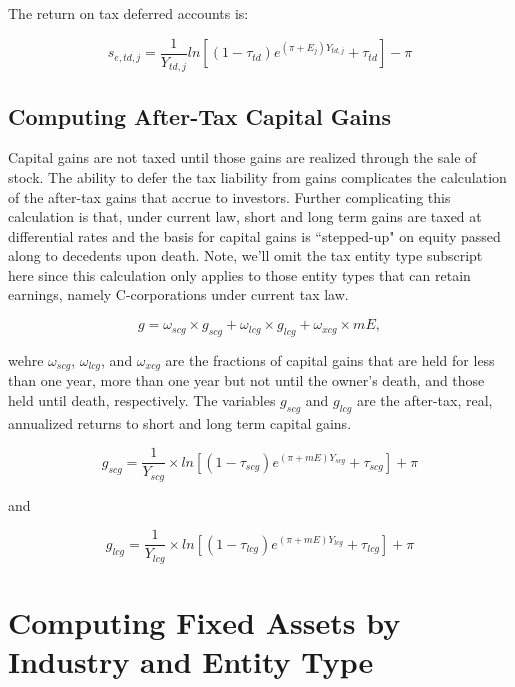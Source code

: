 \documentclass[article,11pt,letterpaper,fleqn]{article}
\theoremstyle{definition}
\numberwithin{equation}{section}
\begin{document}
 The return on tax deferred accounts is:
 
 \begin{equation}
s_{e,td,j} = \frac{1}{Y_{td,j}}ln \left[(1-\tau_{td})e^{(\pi+E_{j})Y_{td,j}}+\tau_{td}\right]-\pi
\end{equation}
 

\subsection{Computing After-Tax Capital Gains}

Capital gains are not taxed until those gains are realized through the sale of stock.  The ability to defer the tax liability from gains complicates the calculation of the after-tax gains that accrue to investors. Further complicating this calculation is that, under current law, short and long term gains are taxed at differential rates and the basis for capital gains is ``stepped-up" on equity passed along to decedents upon death.  Note, we'll omit the tax entity type subscript here since this calculation only applies to those entity types that can retain earnings, namely C-corporations under current tax law. 

\begin{equation}
g = \omega_{scg}\times g_{scg} + \omega_{lcg}\times g_{lcg} + \omega_{xcg}\times mE,
\end{equation}
 
 \noindent\noindent wehre $\omega_{scg}$, $\omega_{lcg}$, and $\omega_{xcg}$ are the fractions of capital gains that are held for less than one year, more than one year but not until the owner's death, and those held until death, respectively.  The variables $g_{scg}$ and $g_{lcg}$ are the after-tax, real, annualized returns to short and long term capital gains.
 
\begin{equation}
g_{scg} = \frac{1}{Y_{scg}}\times ln\left[(1-\tau_{scg})e^{(\pi+mE)Y_{scg}}+\tau_{scg}\right]+\pi
\end{equation}

\noindent\noindent and

\begin{equation}
g_{lcg} = \frac{1}{Y_{lcg}}\times ln\left[(1-\tau_{lcg})e^{(\pi+mE)Y_{lcg}}+\tau_{lcg}\right]+\pi
\end{equation}


\section{Computing Fixed Assets by Industry and Entity Type}
\label{sec:assets}
\end{document}
